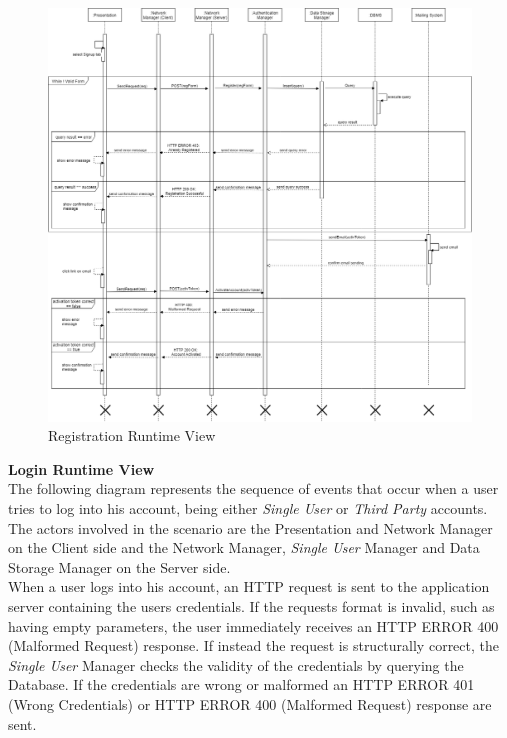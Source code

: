\documentclass[titlepage]{article}
\begin{document}
	\begin{figure}[H]
		\center
		\includegraphics[width=15cm]{Registration.png}
		\caption{Registration Runtime View}
		\label{fig:REG}
	\end{figure}
	\noindent
	{\bf Login Runtime View }\\ 
	The following diagram represents the sequence of events that occur when a user tries to log into his account, being either {\it Single User} or {\it Third Party} accounts. The actors involved in the scenario are the Presentation and Network Manager on the Client side and the Network Manager, {\it Single User} Manager and Data Storage Manager on the Server side. \\
	When a user logs into his account, an HTTP request is sent to the application server containing the user\textsc{}s credentials. If the request\textsc{}s format is invalid, such as having empty parameters, the user immediately receives an HTTP ERROR 400 (Malformed Request) response. If instead the request is structurally correct, the {\it Single User} Manager checks the validity of the credentials by querying the Database. If the credentials are wrong or malformed an HTTP ERROR 401 (Wrong Credentials) or HTTP ERROR 400 (Malformed Request) response are sent.\\
	
\end{document}
